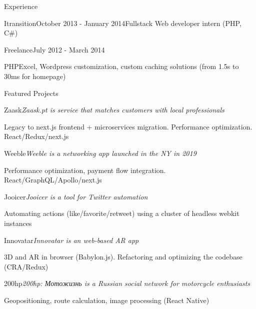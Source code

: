 \documentclass{resume} %
\begin{document}
\begin{rSection}{Experience}
\begin{rSubsection}{Itransition}{October 2013 - January 2014}{Fullstack Web developer intern (PHP, C\#)}{}
\end{rSubsection}

\begin{rSubsection}{Freelance}{July 2012 - March 2014}{}{}
\item PHPExcel, Wordpress customization, custom caching solutions (from 1.5s to 30ms for homepage)
\end{rSubsection}

\end{rSection}

\clearpage

\begin{rSection}{Featured Projects}


\begin{rSubsection}{Zaask}{\it Zaask.pt is service that matches customers with local professionals}{}{}
\item Legacy to next.js frontend + microservices migration. Performance optimization. React/Redux/next.js
\end{rSubsection}

\begin{rSubsection}{Weeble}{\it Weeble is a networking app launched in the NY in 2019}{}{}
\item Performance optimization, payment flow integration. React/GraphQL/Apollo/next.js
\end{rSubsection}

\begin{rSubsection}{Jooicer}{\it Jooicer is a tool for Twitter automation}{}{}
\item Automating actions (like/favorite/retweet) using a cluster of headless webkit instances
\end{rSubsection}

\begin{rSubsection}{Innovatar}{\it Innovatar is an web-based AR app}{}{}
\item 3D and AR in browser (Babylon.js). Refactoring and optimizing the codebase (CRA/Redux)
\end{rSubsection}

\begin{rSubsection}{200hp}{\it 200hp: \foreignlanguage{russian}{Мотожизнь} is a Russian social network for motorcycle enthusiasts}{}{}
\item Geopositioning, route calculation, image processing (React Native)
\end{rSubsection}

\end{rSection}
\end{document}
